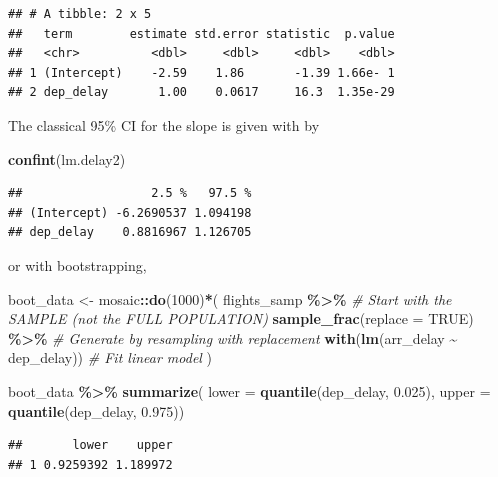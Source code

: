 \documentclass[
]{book}
\newenvironment{Shaded}{\begin{snugshade}}{\end{snugshade}}
\newcommand{\AttributeTok}[1]{\textcolor[rgb]{0.13,0.29,0.53}{#1}}
\newcommand{\CommentTok}[1]{\textcolor[rgb]{0.56,0.35,0.01}{\textit{#1}}}
\newcommand{\ConstantTok}[1]{\textcolor[rgb]{0.56,0.35,0.01}{#1}}
\newcommand{\DecValTok}[1]{\textcolor[rgb]{0.00,0.00,0.81}{#1}}
\newcommand{\FloatTok}[1]{\textcolor[rgb]{0.00,0.00,0.81}{#1}}
\newcommand{\FunctionTok}[1]{\textcolor[rgb]{0.13,0.29,0.53}{\textbf{#1}}}
\newcommand{\NormalTok}[1]{#1}
\newcommand{\OtherTok}[1]{\textcolor[rgb]{0.56,0.35,0.01}{#1}}
\newcommand{\SpecialCharTok}[1]{\textcolor[rgb]{0.81,0.36,0.00}{\textbf{#1}}}
\begin{document}
\begin{verbatim}
## # A tibble: 2 x 5
##   term        estimate std.error statistic  p.value
##   <chr>          <dbl>     <dbl>     <dbl>    <dbl>
## 1 (Intercept)    -2.59    1.86       -1.39 1.66e- 1
## 2 dep_delay       1.00    0.0617     16.3  1.35e-29
\end{verbatim}

The classical 95\% CI for the slope is given with by

\begin{Shaded}
\begin{Highlighting}[]
\FunctionTok{confint}\NormalTok{(lm.delay2)}
\end{Highlighting}
\end{Shaded}

\begin{verbatim}
##                  2.5 %   97.5 %
## (Intercept) -6.2690537 1.094198
## dep_delay    0.8816967 1.126705
\end{verbatim}

or with bootstrapping,

\begin{Shaded}
\begin{Highlighting}[]
\NormalTok{boot\_data }\OtherTok{\textless{}{-}}\NormalTok{ mosaic}\SpecialCharTok{::}\FunctionTok{do}\NormalTok{(}\DecValTok{1000}\NormalTok{)}\SpecialCharTok{*}\NormalTok{( }
\NormalTok{    flights\_samp }\SpecialCharTok{\%\textgreater{}\%} \CommentTok{\# Start with the SAMPLE (not the FULL POPULATION)}
      \FunctionTok{sample\_frac}\NormalTok{(}\AttributeTok{replace =} \ConstantTok{TRUE}\NormalTok{) }\SpecialCharTok{\%\textgreater{}\%} \CommentTok{\# Generate by resampling with replacement}
      \FunctionTok{with}\NormalTok{(}\FunctionTok{lm}\NormalTok{(arr\_delay }\SpecialCharTok{\textasciitilde{}}\NormalTok{ dep\_delay)) }\CommentTok{\# Fit linear model}
\NormalTok{)}

\NormalTok{boot\_data }\SpecialCharTok{\%\textgreater{}\%}
  \FunctionTok{summarize}\NormalTok{(}
    \AttributeTok{lower =} \FunctionTok{quantile}\NormalTok{(dep\_delay, }\FloatTok{0.025}\NormalTok{),}
    \AttributeTok{upper =} \FunctionTok{quantile}\NormalTok{(dep\_delay, }\FloatTok{0.975}\NormalTok{))}
\end{Highlighting}
\end{Shaded}

\begin{verbatim}
##       lower    upper
## 1 0.9259392 1.189972
\end{verbatim}
\end{document}
